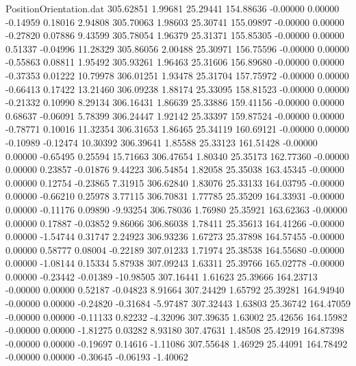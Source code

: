 \begin{filecontents}{PositionOrientation.dat}
 305.62851    1.99681   25.29441   154.88636   -0.00000    0.00000   -0.14959    0.18016    2.94808
 305.70063    1.98603   25.30741   155.09897   -0.00000    0.00000   -0.27820    0.07886    9.43599
 305.78054    1.96379   25.31371   155.85305   -0.00000    0.00000    0.51337   -0.04996   11.28329
 305.86056    2.00488   25.30971   156.75596   -0.00000    0.00000   -0.55863    0.08811    1.95492
 305.93261    1.96463   25.31606   156.89680   -0.00000    0.00000   -0.37353    0.01222   10.79978
 306.01251    1.93478   25.31704   157.75972   -0.00000    0.00000   -0.66413    0.17422   13.21460
 306.09238    1.88174   25.33095   158.81523   -0.00000    0.00000   -0.21332    0.10990    8.29134
 306.16431    1.86639   25.33886   159.41156   -0.00000    0.00000    0.68637   -0.06091    5.78399
 306.24447    1.92142   25.33397   159.87524   -0.00000    0.00000   -0.78771    0.10016   11.32354
 306.31653    1.86465   25.34119   160.69121   -0.00000    0.00000   -0.10989   -0.12474   10.30392
 306.39641    1.85588   25.33123   161.51428   -0.00000    0.00000   -0.65495    0.25594   15.71663
 306.47654    1.80340   25.35173   162.77360   -0.00000    0.00000    0.23857   -0.01876    9.44223
 306.54854    1.82058   25.35038   163.45345   -0.00000    0.00000    0.12754   -0.23865    7.31915
 306.62840    1.83076   25.33133   164.03795   -0.00000    0.00000   -0.66210    0.25978    3.77115
 306.70831    1.77785   25.35209   164.33931   -0.00000    0.00000   -0.11176    0.09890   -9.93254
 306.78036    1.76980   25.35921   163.62363   -0.00000    0.00000    0.17887   -0.03852    9.86066
 306.86038    1.78411   25.35613   164.41266   -0.00000    0.00000   -1.54744    0.31747    2.24923
 306.93236    1.67273   25.37898   164.57455   -0.00000    0.00000    0.58777    0.08004   -0.22189
 307.01233    1.71974   25.38538   164.55680   -0.00000    0.00000   -1.08144    0.15334    5.87938
 307.09243    1.63311   25.39766   165.02778   -0.00000    0.00000   -0.23442   -0.01389  -10.98505
 307.16441    1.61623   25.39666   164.23713   -0.00000    0.00000    0.52187   -0.04823    8.91664
 307.24429    1.65792   25.39281   164.94940   -0.00000    0.00000   -0.24820   -0.31684   -5.97487
 307.32443    1.63803   25.36742   164.47059   -0.00000    0.00000   -0.11133    0.82232   -4.32096
 307.39635    1.63002   25.42656   164.15982   -0.00000    0.00000   -1.81275    0.03282    8.93180
 307.47631    1.48508   25.42919   164.87398   -0.00000    0.00000   -0.19697    0.14616   -1.11086
 307.55648    1.46929   25.44091   164.78492   -0.00000    0.00000   -0.30645   -0.06193   -1.40062

\end{filecontents}
